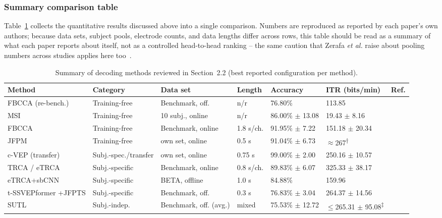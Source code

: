 \documentclass[11pt]{article}
\begin{document}
\subsubsection{Summary comparison table}

Table~\ref{tab:sota} collects the quantitative results discussed above into a single comparison. Numbers are reproduced as reported by each paper's own authors; because data sets, subject pools, electrode counts, and data lengths differ across rows, this table should be read as a summary of what each paper reports about itself, not as a controlled head-to-head ranking -- the same caution that Zerafa \textit{et al.} raise about pooling numbers across studies applies here too~\cite{zerafa2018train}.

\begin{table}[htbp]
\centering
\caption{Summary of decoding methods reviewed in Section~2.2 (best reported configuration per method).}
\label{tab:sota}
\scriptsize
\setlength{\tabcolsep}{3pt}
\begin{tabular}{@{}p{2.3cm} p{1.7cm} p{1.9cm} p{1.1cm} p{1.6cm} p{1.7cm} p{0.6cm}@{}}
\toprule
\textbf{Method} & \textbf{Category} & \textbf{Data set} & \textbf{Length} & \textbf{Accuracy} & \textbf{ITR (bits/min)} & \textbf{Ref.} \\
\midrule
FBCCA (re-bench.) & Training-free & Benchmark, off. & n/r & 76.80\% & 113.85 & \cite{chen2015fbcca} \\
MSI & Training-free & 10 subj., online & n/r & 86.00\% $\pm$ 13.08 & 19.43 $\pm$ 8.16 & \cite{zhang2014msi} \\
FBCCA & Training-free & Benchmark, online & 1.8 s/ch. & 91.95\% $\pm$ 7.22 & 151.18 $\pm$ 20.34 & \cite{chen2015fbcca} \\
JFPM & Training-free & own set, online & 0.5 s & 91.04\% $\pm$ 6.73 & $\approx$267\textsuperscript{$\dagger$} & \cite{chen2015pnas} \\
c-VEP (transfer) & Subj.-spec./transfer & own set, online & 0.75 s & 99.00\% $\pm$ 2.00 & 250.16 $\pm$ 10.57 & \cite{miao2024cvepminimal} \\
TRCA / eTRCA & Subj.-specific & Benchmark, online & 0.8 s/ch. & 89.83\% $\pm$ 6.07 & 325.33 $\pm$ 38.17 & \cite{nakanishi2018trca} \\
eTRCA+sbCNN & Subj.-specific & BETA, offline & 1.0 s & 84.88\% & 159.96 & \cite{wei2025etrcasbcnn} \\
t-SSVEPformer +JFPTS & Subj.-specific & Benchmark, off. & 0.3 s & 76.83\% $\pm$ 3.04 & 264.37 $\pm$ 14.56 & \cite{ding2026jfpts} \\
SUTL & Subj.-indep. & Benchmark, off. (avg.) & mixed & 75.53\% $\pm$ 12.72 & $\leq$265.31 $\pm$ 95.08\textsuperscript{$\ddagger$} & \cite{li2024sutl} \\
\bottomrule
\end{tabular}


\end{table}
\end{document}
